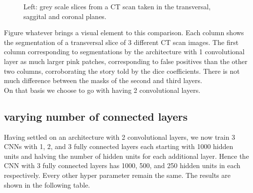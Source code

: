 \begin{figure}
\centering
{}
\caption{Left: grey scale slices from a CT scan taken in the transversal, saggital and coronal planes.}
\end{figure}

Figure whatever brings a visual element to this comparison. Each column shows the segmentation of a transversal slice of 3 different CT scan images. The first column corresponding to segmentations by the architecture with 1 convolutional layer as much larger pink patches, corresponding to false positives than the other two columns, corroborating the story told by the dice coefficients. There is not much difference between the masks of the second and third layers.\\

On that basis we choose to go with having 2 convolutional layers. 

\subsection{varying number of connected layers}

Having settled on an architecture with 2 convolutional layers, we now train 3 CNNs with 1, 2, and 3 fully connected layers each starting with 1000 hidden units and halving the number of hidden units for each additional layer. Hence the CNN with 3 fully connected layers has 1000, 500, and 250 hidden units in each respectively. Every other hyper parameter remain the same. The results are shown in the following table.\\

